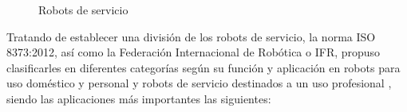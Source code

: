  \begin{figure}[H]
    \begin{center}
      \subcapcentertrue
      \hspace{2mm}
      \hspace{2mm}
    \end{center}
    \caption{Robots de servicio}
    \label{fig:Robots_servicio}
  \end{figure}

Tratando de establecer una división de los robots de servicio, la norma ISO 8373:2012, así como la Federación Internacional de Robótica o IFR, propuso clasificarles en diferentes categorías según su función y aplicación en robots para uso doméstico y personal y robots de servicio destinados a un uso profesional \cite{Gonzalez21}, siendo las aplicaciones más importantes las siguientes:

